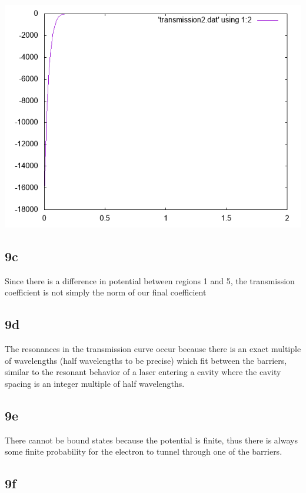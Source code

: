 \documentclass{article}
\begin{document}
\includegraphics[width=\textwidth]{transmission.png}


\subsection*{9c}

Since there is a difference in potential between regions 1 and 5, the transmission coefficient is not simply the norm of our final coefficient\\

\subsection*{9d}

The resonances in the transmission curve occur because there is an exact multiple of wavelengths (half wavelengths to be precise) which fit between the barriers, similar to the resonant behavior of a laser entering a cavity where the cavity spacing is an integer multiple of half wavelengths.\\

\subsection*{9e}

There cannot be bound states because the potential is finite, thus there is always some finite probability for the electron to tunnel through one of the barriers.\\

\subsection*{9f}
\end{document}

